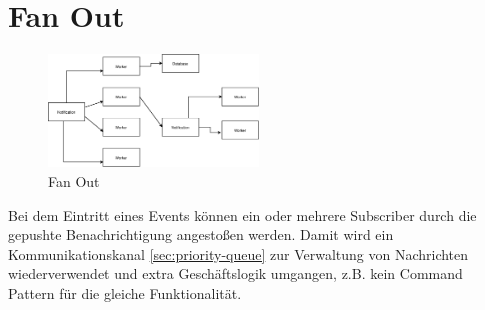 \documentclass[
12pt,
english,
ngerman,
headsepline,
twoside,
openright,
numbers=noenddot,version=first
]{scrreprt}
\begin{document}
\section{Fan Out}
\label{sec:fan-out}
\begin{figure}[H]
	\centering
\includegraphics[height=3cm]{./pics/pattern-fan-out.eps}
\caption{Fan Out}
\label{pic:fan-out}
\end{figure}
Bei dem Eintritt eines Events können ein oder mehrere Subscriber durch die gepushte Benachrichtigung angestoßen werden. Damit wird ein Kommunikationskanal  \autoref{sec:priority-queue} zur Verwaltung von Nachrichten wiederverwendet und extra Geschäftslogik umgangen, z.B. kein Command Pattern für die gleiche Funktionalität\cite{serverlessArchAWS}.
\end{document}
